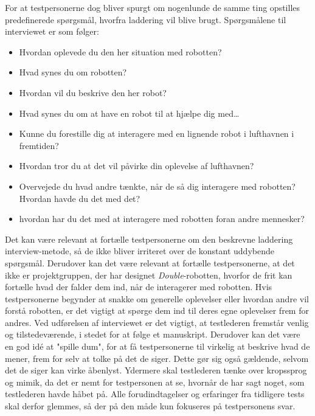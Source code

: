 For at testpersonerne dog bliver spurgt om nogenlunde de samme ting opstilles predefinerede spørgsmål, hvorfra laddering vil blive brugt. Spørgsmålene til interviewet er som følger:\blankline
\begin{itemize}
	\item Hvordan oplevede du den her situation med robotten?
	\item Hvad synes du om robotten?
	\item Hvordan vil du beskrive den her robot?
	\item Hvad synes du om at have en robot til at hjælpe dig med…
	\item Kunne du forestille dig at interagere med en lignende robot i lufthavnen i fremtiden?
	\item Hvordan tror du at det vil påvirke din oplevelse af lufthavnen?
	\item Overvejede du hvad andre tænkte, når de så dig interagere med robotten? Hvordan havde du det med det?
	\item hvordan har du det med at interagere med robotten foran andre mennesker?\blankline
\end{itemize}
\noindent
%
Det kan være relevant at fortælle testpersonerne om den beskrevne laddering interview-metode, så de ikke bliver irriteret over de konstant uddybende spørgsmål. Derudover kan det være relevant at fortælle testpersonerne, at det ikke er projektgruppen, der har designet \textit{Double}-robotten, hvorfor de frit kan fortælle hvad der falder dem ind, når de interagerer med robotten. Hvis testpersonerne begynder at snakke om generelle oplevelser eller hvordan andre vil forstå robotten, er det vigtigt at spørge dem ind til deres egne oplevelser frem for andres. \blankline
%
Ved udførelsen af interviewet er det vigtigt, at testlederen fremstår venlig og tilstedeværende, i stedet for at følge et manuskript. Derudover kan det være en god idé at "spille dum", for at få testpersonerne til virkelig at beskrive hvad de mener, frem for selv at tolke på det de siger. Dette gør sig også gældende, selvom det de siger kan virke åbenlyst. Ydermere skal testlederen tænke over kropssprog og mimik, da det er nemt for testpersonen at se, hvornår de har sagt noget, som testlederen havde håbet på. Alle forudindtagelser og erfaringer fra tidligere tests skal derfor glemmes, så der på den måde kun fokuseres på testpersonens svar. 
